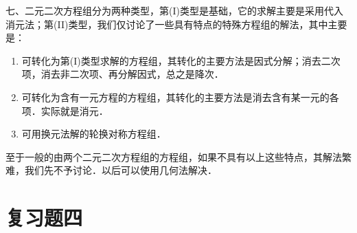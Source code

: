     七、二元二次方程组分为两种类型，第(I)类型是基础，它的求解主要是采用代入消元法；第(II)类型，我们仅讨论了一些具有特点的特殊方程组的解法，其中主要是：
    \begin{enumerate}
        \item 可转化为第(I)类型求解的方程组，其转化的主要方法是因式分解；消去二次项，消去非二次项、再分解因式，总之是降次．
        \item 可转化为含有一元方程的方程组，其转化的主要方法是消去含有某一元的各项．实际就是消元．
        \item 可用换元法解的轮换对称方程组．
\end{enumerate}

至于一般的由两个二元二次方程组的方程组，如果不具有以上这些特点，其解法繁难，我们先不予讨论．以后可以使用几何法解决．


\section*{复习题四}
